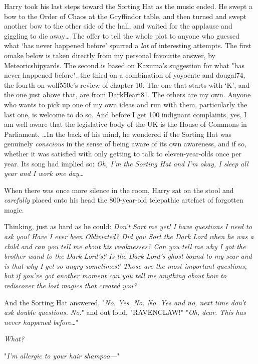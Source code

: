 Harry took his last steps toward the Sorting Hat as the music ended. He swept a
bow to the Order of Chaos at the Gryffindor table, and then turned and swept
another bow to the other side of the hall, and waited for the applause and
giggling to die away{\ldots}
The offer to tell the whole plot to anyone who guessed what `has never happened
before' spurred a \emph{lot} of interesting attempts. The first omake below is
taken directly from my personal favourite answer, by Meteoricshipyards. The
second is based on Kazuma's suggestion for what "has never happened before",
the third on a combination of yoyoente and dougal74, the fourth on wolf550e's
review of chapter 10. The one that starts with `K', and the one just above
that, are from DarkHeart81. The others are my own. Anyone who wants to pick up
one of my own ideas and run with them, particularly the last one, is welcome to
do so. And before I get 100 indignant complaints, yes, I am well aware that the
legislative body of the UK is the House of Commons in Parliament.
\later
{\ldots}In the back of his mind, he wondered if the Sorting Hat was genuinely
\emph{conscious} in the sense of being aware of its own awareness, and if so,
whether it was satisfied with only getting to talk to eleven-year-olds once per
year. Its song had implied so: \emph{Oh, I'm the Sorting Hat and I'm okay, I
sleep all year and I work one day{\ldots}}

When there was once more silence in the room, Harry sat on the stool and
\emph{carefully} placed onto his head the 800-year-old telepathic artefact of
forgotten magic.

Thinking, just as hard as he could: \emph{Don't Sort me yet! I have questions I
need to ask you! Have I ever been Obliviated? Did you Sort the Dark Lord when
he was a child and can you tell me about his weaknesses? Can you tell me why I
got the brother wand to the Dark Lord's? Is the Dark Lord's ghost bound to my
scar and is that why I get so angry sometimes? Those are the most important
questions, but if you've got another moment can you tell me anything about how
to rediscover the lost magics that created you?}

And the Sorting Hat answered, "\emph{No. Yes. No. No. Yes and no, next time
don't ask double questions. No.}" and out loud, "RAVENCLAW!"
\later
"\emph{Oh, dear. This has never happened before{\ldots}}"

\emph{What?}

"\emph{I'm allergic to your hair shampoo---}"

